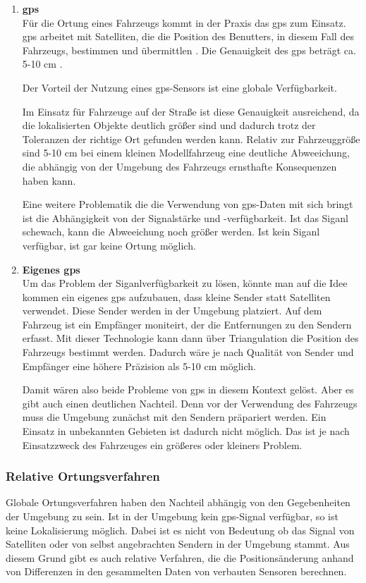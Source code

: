 \begin{enumerate}
    \item \textbf{\acf{gps}}\\
    Für die Ortung eines Fahrzeugs kommt in der Praxis das \ac{gps} zum Einsatz. 
    \ac{gps} arbeitet mit Satelliten, die die Position des Benutters, in diesem Fall des Fahrzeugs, bestimmen
    und übermittlen \cite{ashby2003relativity}. Die Genauigkeit des \ac{gps} beträgt ca. 5-10 cm \cite{ashby2003relativity}.

    Der Vorteil der Nutzung eines \ac{gps}-Sensors ist eine globale Verfügbarkeit.

    Im Einsatz für Fahrzeuge auf der Straße ist diese Genauigkeit ausreichend, da die lokalisierten Objekte deutlich größer sind und dadurch
    trotz der Toleranzen der richtige Ort gefunden werden kann.
    Relativ zur Fahrzeuggröße sind 5-10 cm bei einem kleinen Modellfahrzeug eine deutliche Abweeichung, die abhängig von der Umgebung des Fahrzeugs ernsthafte Konsequenzen haben kann.

    Eine weitere Problematik die die Verwendung von \ac{gps}-Daten mit sich bringt ist die Abhängigkeit von der Signalstärke und -verfügbarkeit. 
    Ist das Siganl schewach, kann die Abweeichung noch größer werden. Ist kein Siganl
    verfügbar, ist gar keine Ortung möglich.
    \item \textbf{Eigenes \ac{gps}}\\
    Um das Problem der Siganlverfügbarkeit zu lösen, könnte man auf die Idee kommen ein eigenes \acf{gps} aufzubauen, dass kleine Sender statt Satelliten verwendet.
    Diese Sender werden in der Umgebung platziert. 
    Auf dem Fahrzeug ist ein Empfänger moniteirt, der die Entfernungen zu den Sendern erfasst.
    Mit dieser Technologie kann dann über Triangulation die Position des Fahrzeugs bestimmt werden. Dadurch wäre je nach Qualität von Sender und Empfänger eine höhere Präzision als 
    5-10 cm möglich. 
    
    Damit wären also beide Probleme von \ac{gps} in diesem Kontext gelöst. Aber es gibt auch einen deutlichen Nachteil. Denn vor der Verwendung des Fahrzeugs muss die Umgebung zunächst
    mit den Sendern präpariert werden. Ein Einsatz in unbekannten Gebieten ist dadurch nicht möglich. Das ist je nach Einsatzzweck des Fahrzeuges ein größeres oder kleiners Problem.
\end{enumerate}

\subsubsection{Relative Ortungsverfahren}
Globale Ortungsverfahren haben den Nachteil abhängig von den Gegebenheiten der Umgebung zu sein.
Ist in der Umgebung kein \ac{gps}-Signal verfügbar, so ist keine Lokalisierung möglich.
Dabei ist es nicht von Bedeutung ob das Signal von Satelliten oder von selbst angebrachten Sendern in der Umgebung stammt.
Aus diesem Grund gibt es auch relative Verfahren, die die Positionsänderung anhand von Differenzen in den gesammelten Daten 
von verbauten Sensoren berechnen.

